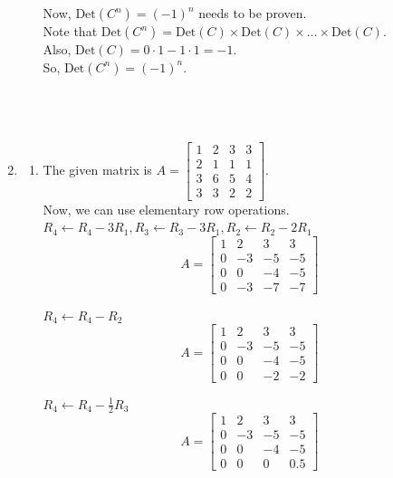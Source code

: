 \documentclass[a4paper]{article}
\begin{document}
\begin{enumerate}
\begin{enumerate}
        Now, \(\text{Det}(C^n) = (-1)^n\) needs to be proven.\\
        Note that \(\text{Det}(C^n) = \text{Det}(C) \times \text{Det}(C) \times \dots \times \text{Det}(C)\).\\
        Also, \(\text{Det}(C) = 0 \cdot 1 - 1 \cdot 1 = -1\).\\
        So, \(\text{Det}(C^n) = (-1)^n\).\\ \\ \\ \\

        \end{enumerate}

        \item \begin{enumerate}
            \item The given matrix is \(A = \begin{bmatrix} 1 & 2 & 3 & 3 \\ 2 & 1 & 1 & 1 \\ 3 & 6 & 5 & 4 \\ 3 & 3 & 2 & 2 \end{bmatrix}\).\\
            
            Now, we can use elementary row operations.
            $R_4 \leftarrow R_4 - 3R_1, R_3 \leftarrow R_3 - 3R_1, R_2 \leftarrow R_2 - 2R_1$\\
            \[A = \begin{bmatrix} 1 & 2 & 3 & 3 \\ 0 & -3 & -5 & -5 \\ 0 & 0 & -4 & -5 \\ 0 & -3 & -7 & -7 \end{bmatrix}\]

            $R_4 \leftarrow R_4 - R_2$\\
            \[A = \begin{bmatrix} 1 & 2 & 3 & 3 \\ 0 & -3 & -5 & -5 \\ 0 & 0 & -4 & -5 \\ 0 & 0 & -2 & -2 \end{bmatrix}\]

            $R_4 \leftarrow R_4 - \frac{1}{2}R_3$\\
            \[A = \begin{bmatrix} 1 & 2 & 3 & 3 \\ 0 & -3 & -5 & -5 \\ 0 & 0 & -4 & -5 \\ 0 & 0 & 0 & 0.5 \end{bmatrix}\]


\end{enumerate}
\end{enumerate}
\end{document}
